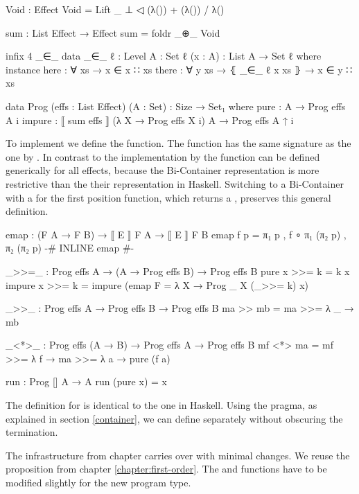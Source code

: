 \begin{code}[hide]
Void : Effect
Void = Lift _ ⊥ ◁ (λ()) + (λ()) / λ()

sum : List Effect → Effect
sum = foldr _⊕_ Void

infix 4 _∈_
data _∈_ {ℓ : Level} {A : Set ℓ} (x : A) : List A → Set ℓ where
  instance
    here   : ∀ {xs} → x ∈ x ∷ xs
    there  : ∀ {y xs} → ⦃ _∈_ {ℓ} x xs ⦄ → x ∈ y ∷ xs
\end{code}
\begin{code}
data Prog (effs : List Effect) (A : Set) : {Size} → Set₁ where
  pure    : A → Prog effs A {i}
  impure  : ⟦ sum effs ⟧ (λ X → Prog effs X {i}) A → Prog effs A {↑ i}
\end{code}
To implement \AgdaFunction{>>=} we define the  function.
The function has the same signature as the one by
\textcite{DBLP:conf/haskell/WuSH14}.
In contrast to the implementation by \textcite{DBLP:conf/haskell/WuSH14} the
function can be defined generically for all effects, because the Bi-Container
representation is more restrictive than the their representation in Haskell.
Switching to a Bi-Container with a  for the first position
function, which returns a , preserves this general
definition. %

\begin{code}
emap : (F A → F B) → ⟦ E ⟧ F A → ⟦ E ⟧ F B
emap f p = π₁ p , f ∘ π₁ (π₂ p) , π₂ (π₂ p)
{-# INLINE emap #-}

_>>=_ : Prog effs A → (A → Prog effs B) → Prog effs B
pure x    >>= k = k x
impure x  >>= k = impure (emap {F = λ X → Prog _ X} (_>>= k) x)
\end{code}
\begin{code}[hide]
_>>_ : Prog effs A → Prog effs B → Prog effs B
ma >> mb = ma >>= λ _ → mb

_<*>_ : Prog effs (A → B) → Prog effs A → Prog effs B
mf <*> ma = mf >>= λ f → ma >>= λ a → pure (f a)

run : Prog [] A → A
run (pure x) = x
\end{code}
The definition for \AgdaFunction{>>=} is identical to the one in Haskell.
Using the  pragma, as explained in section \ref{container},
we can define  separately without obscuring the termination.

The infrastructure from chapter carries over with
minimal changes.
We reuse the  proposition from chapter
\ref{chapter:first-order}.
The  and  functions have to be modified
slightly for the new program type.

